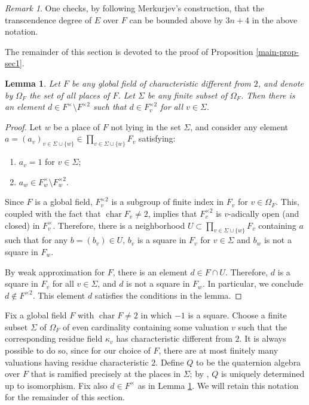 \documentclass[11pt,letterpaper]{amsart}
\theoremstyle{plain}
\newtheorem{lemma}[theorem]{Lemma}
\theoremstyle{definition}
\theoremstyle{remark}
\newtheorem*{remark}{Remark}
\begin{document}
    \begin{remark}
        One checks, by following Merkurjev's construction, that the transcendence degree of $E$ over $F$ can be bounded above by $3n+4$ in the above notation.
    \end{remark}

    The remainder of this section is devoted to the proof of Proposition \ref{main-prop-sec1}.

    \begin{lemma}\label{d-exists}
    Let $F$ be any global field of characteristic different from $2$, and denote by $\Omega_F$ the set of all places of $F$. Let $\Sigma$ be any finite subset of $\Omega_F$. Then there is an element $d\in F^{\times}\setminus F^{\times 2}$ such that $d\in F_v^{\times 2}$ for all $v\in \Sigma$.
\end{lemma}
\begin{proof}
    Let $w$ be a place of $F$ not lying in the set $\Sigma$, and consider any element $a = (a_v)_{v\in\Sigma\cup\{w\}}\in \prod_{v\in\Sigma\cup\{w\}}F_v$ satisfying: \begin{enumerate}
        \item $a_v = 1$ for $v\in \Sigma$;
        \item $a_w\in F_w^\times\setminus F_w^{\times 2}$.
    \end{enumerate}
    Since $F$ is a global field, $F_v^{\times 2}$ is a subgroup of finite index in $F_v$ for $v\in\Omega_F$. This, coupled with the fact that $\operatorname{char}F_v\neq 2$, implies that $F_v^{\times 2}$ is $v$-adically open (and closed) in $F_v^{\times}$. Therefore, there is a neighborhood $U\subset \prod_{v\in\Sigma\cup\{w\}}F_v$ containing $a$ such that for any $b = (b_v)\in U$, $b_v$ is a square in $F_v$ for $v\in \Sigma$ and $b_w$ is not a square in $F_w$.

    By weak approximation for $F$, there is an element $d\in F\cap U$. Therefore, $d$ is a square in $F_v$ for all $v\in \Sigma$, and $d$ is not a square in $F_w$. In particular, we conclude $d\notin F^{\times 2}$. This element $d$ satisfies the conditions in the lemma.
\end{proof}

Fix a global field $F$ with $\operatorname{char}F\neq 2$ in which $-1$ is a square.
Choose a finite subset $\Sigma$ of $\Omega_F$ of even cardinality containing some valuation $v$ such that the corresponding residue field $\kappa_v$ has characteristic different from $2$. It is always possible to do so, since for our choice of $F$, there are at most finitely many valuations having residue characteristic $2$.
Define $Q$ to be the quaternion algebra over $F$ that is ramified precisely at the places in $\Sigma$; by \cite[Theorem 2.7.5]{maclachlan2013arithmetic}, $Q$ is uniquely determined up to isomorphism. Fix also $d\in F^\times$ as in Lemma \ref{d-exists}. We will retain this notation for the remainder of this section.
\end{document}
